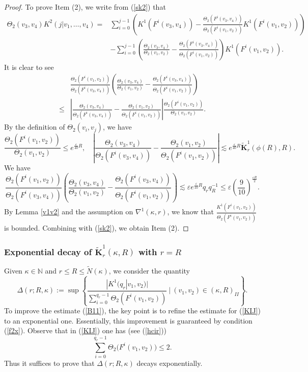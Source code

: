 \documentclass{amsart}
\theoremstyle{definition}
\begin{document}
\begin{proof}
To prove Item (2), we write from (\ref{sk2}) that
\begin{align*}
	\Theta_2(v_3,v_4)K^2(j|v_1,\ldots,v_4)=&\sum_{i=0}^{j-1}\left(K^1(F^i(v_3,v_4))-\frac{\Theta_2(F^i(v_3,v_4))}{\Theta_2(F^i(v_1,v_2))}K^1(F^i(v_1,v_2))\right)\\
	&-\sum_{i=0}^{j-1}\left(\frac{\Theta_2(v_3,v_4)}{\Theta_2(v_1,v_2)}-\frac{\Theta_2(F^i(v_3,v_4))}{\Theta_2(F^i(v_1,v_2))}\right)K^1(F^i(v_1,v_2)).
\end{align*}
It is clear to see
\begin{align*}
	&\frac{\Theta_2(F^i(v_1,v_2))}{\Theta_2(F^i(v_3,v_4))}\left(\frac{\Theta_2(v_3,v_4)}{\Theta_2(v_1,v_2)}-
	\frac{\Theta_2(F^i(v_3,v_4))}{\Theta_2(F^i(v_1,v_2))}\right)\\
	\leq &\left|\frac{\Theta_2(v_3,v_4)}{\Theta_2(F^i(v_3,v_4))}-\frac{\Theta_2(v_1,v_2)}{\Theta_2(F^i(v_1,v_2))}\right|
	\frac{\Theta_2(F^i(v_1,v_2))}{\Theta_2(v_1,v_2)}.
\end{align*}
By the definition of $\Theta_2(v_i,v_j)$, we have
\[\frac{\Theta_2(F^i(v_1,v_2))}{\Theta_2(v_1,v_2)}\leq e^{\frac{\varepsilon}{40}R},\quad\left|\frac{\Theta_2(v_3,v_4)}{\Theta_2(F^i(v_3,v_4))}
-\frac{\Theta_2(v_1,v_2)}{\Theta_2(F^i(v_1,v_2))}\right|\lesssim e^{\frac{\varepsilon}{40}R}\widetilde{\mathbf{K}}_r^1(\phi(R),R).\]
We have
\[\frac{\Theta_2(F^i(v_1,v_2))}{\Theta_2(F^i(v_3,v_4))}\left(\frac{\Theta_2(v_3,v_4)}{\Theta_2(v_1,v_2)}-
\frac{\Theta_2(F^i(v_3,v_4))}{\Theta_2(F^i(v_1,v_2))}\right)\lesssim \varepsilon e^{\frac{\varepsilon}{10}R}q_rq_R^{-1}\leq\varepsilon (\frac{9}{10})^{\frac{\varepsilon R}{2}}.\]
By Lemma \ref{v1v2} and the assumption on $\nabla^1(\kappa,r)$, we know that $\frac{K^1(F^i(v_1,v_2))}{\Theta_2(F^i(v_1,v_2))}$ is bounded. Combining with (\ref{sk2}), we obtain Item (2).
\end{proof}


\subsubsection{Exponential decay of $\widetilde{\mathbf{K}}_r^1(\kappa,R)$ with $r=R$}

Given $\kappa\in \mathbb{N}$ and $r\leq R\leq\tilde{N}(\kappa)$, we consider the quantity
\[\Delta(r;R,\kappa):={\sup}\left\{\frac{|K^1(q_r|v_1,v_2)|}{\sum_{i=0}^{q_r-1}\Theta_2(F^i(v_1,v_2))}\ \big|\ (v_1,v_2)\in (\kappa,R)_{II}\right\}.\]
To improve the estimate (\ref{B11}), the key point is to refine the estimate for (\ref{KIJ}) to an exponential one. Essentially, this improvement is guaranteed by condition (\ref{f2x}). Observe that in (\ref{KIJ}) one has (see (\ref{hcir}))
\begin{equation}\label{r222}
\sum_{i=0}^{q_r-1}\Theta_2\bigl(F^i(v_1,v_2)\bigr)\leq 2.
\end{equation}
Thus it suffices to prove that \(\Delta(r;R,\kappa)\) decays exponentially.
\end{document}
